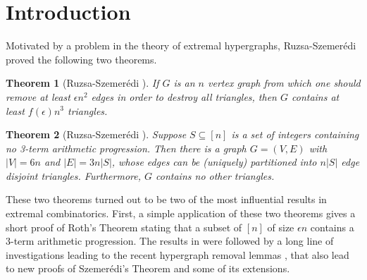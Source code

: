 \documentclass [letterpaper,11pt]{article}
\newtheorem{theo}{Theorem}%
\begin{document}
\maketitle

\begin{abstract}

The triangle removal lemma states that a simple graph with
$o(n^3)$ triangles can be made triangle-free by removing $o(n^2)$
edges. It is natural to ask if this widely used result can be
extended to multi-graphs (or equivalently, weighted graphs). 
In this short paper we rule out the
possibility of such an extension by showing that there are
multi-graphs with only $n^{2+o(1)}$ triangles that are still far
from being triangle-free. On the other hand, we show that for some
$g(n)=\omega(1)$, if a multi-graph (or weighted graph) has only $g(n)n^2$
triangles then
it must be close to being triangle-free. The proof relies on
variants of the Ruzsa-Szemer\'edi theorem \cite{RuS}.

\end{abstract}

\section{Introduction}\label{intro}

Motivated by a problem in the theory of extremal hypergraphs,
Ruzsa-Szemer\'edi \cite{RuS} proved the following two theorems.

\begin{theo}[Ruzsa-Szemer\'edi \cite{RuS}]\label{removallemma}
If $G$ is an $n$ vertex graph from which one should remove at least
$\epsilon n^2$ edges in order to destroy all triangles, then $G$
contains at least $f(\epsilon) n^3$ triangles.
\end{theo}

\begin{theo}[Ruzsa-Szemer\'edi \cite{RuS}]\label{RuzSzeBeh}
Suppose $S \subseteq [n]$ is a set of integers containing no 3-term
arithmetic progression. Then there is a graph $G=(V,E)$ with
$|V|=6n$ and $|E|=3n|S|$, whose edges can be (uniquely) partitioned
into $n|S|$ edge disjoint triangles. Furthermore, $G$ contains no
other triangles.
\end{theo}

These two theorems turned out to be two of the most influential
results in extremal combinatorics. First, a simple application of
these two theorems gives a short proof of Roth's Theorem \cite{Roth}
stating that a subset of $[n]$ of size $\epsilon n$ contains a
$3$-term arithmetic progression. The results in \cite{RuS} were
followed by a long line of investigations leading to the recent
hypergraph removal lemmas \cite{Gowers,NRS,RS,Tao}, that also lead
to new proofs of Szemer\'edi's Theorem \cite{Sztheo} and some of its
extensions.
\end{document}
